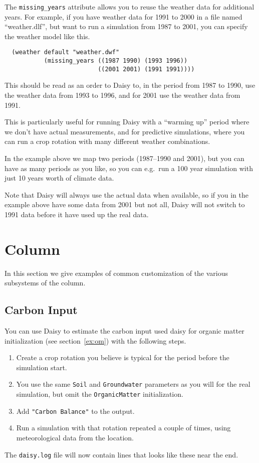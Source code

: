\documentclass[a4paper]{article}
\begin{document}
The \texttt{missing\_years} attribute allows you to reuse the weather
data for additional years.  For example, if you have weather data for
1991 to 2000 in a file named ``weather.dlf'', but want to run a
simulation from 1987 to 2001, you can specify the weather model like
this.
\begin{verbatim}
  (weather default "weather.dwf"
           (missing_years ((1987 1990) (1993 1996))
                          ((2001 2001) (1991 1991))))
\end{verbatim}
This should be read as an order to Daisy to, in the period from 1987
to 1990, use the weather data from 1993 to 1996, and for 2001 use the
weather data from 1991.

This is particularly useful for running Daisy with a ``warming up''
period where we don't have actual measurements, and for predictive
simulations, where you can run a crop rotation with many different
weather combinations.

In the example above we map two periods (1987--1990 and 2001), but you
can have as many periods as you like, so you can e.g.\ run a 100 year
simulation with just 10 years worth of climate data.

Note that Daisy will always use the actual data when available, so if
you in the example above have some data from 2001 but not all, Daisy
will not switch to 1991 data before it have used up the real data.

\section{Column}
\label{sec:column}

In this section we give examples of common customization of the
various subsystems of the column.

\subsection{Carbon Input}
\label{sec:om}

You can use Daisy to estimate the carbon input used daisy{} for
organic matter initialization (see section~\ref{ex:om}) with the
following steps.
\begin{enumerate}
\item Create a crop rotation you believe is typical for the period
  before the simulation start.
\item You use the same \texttt{Soil} and \texttt{Groundwater}
  parameters as you will for the real simulation, but omit the
  \texttt{OrganicMatter} initialization.
\item Add \texttt{"Carbon Balance"} to the output.
\item Run a simulation with that rotation repeated a couple of times,
  using meteorological data from the location.
\end{enumerate}
The \texttt{daisy.log} file will now contain lines that looks like
these near the end.
\end{document}

